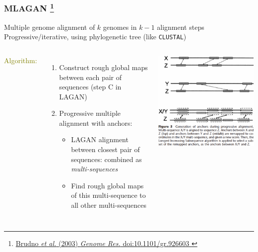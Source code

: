 %
\begin{frame}
  \frametitle{MLAGAN
  \footnote{\tiny{\href{http://dx.doi.org/10.1101/gr.926603
}{Brudno \textit{et al.} (2003) \textit{Genome Res.} doi:10.1101/gr.926603
}}}
  }
  Multiple genome alignment of $k$ genomes in $k-1$ alignment steps \\
  Progressive/iterative, using phylogenetic tree (like \texttt{CLUSTAL})
  \begin{columns}[T] 
      \textcolor{olive}{Algorithm:}
      \begin{enumerate}
        \item \textcolor{hutton_green}{Construct rough global maps between each pair of sequences {\small(step C in LAGAN)}}
        \item \textcolor{hutton_blue}{Progressive multiple alignment with anchors:}
		\begin{itemize}
          \item \textcolor{hutton_purple}{LAGAN alignment between closest pair of sequences: combined as \textit{multi-sequences}}
          \item \textcolor{hutton_purple}{Find rough global maps of this multi-sequence to all other multi-sequences}          
        \end{itemize}
      \end{enumerate}
      \includegraphics[width=\textwidth]{images/mlagan_method}
  \end{columns}    
\end{frame}

